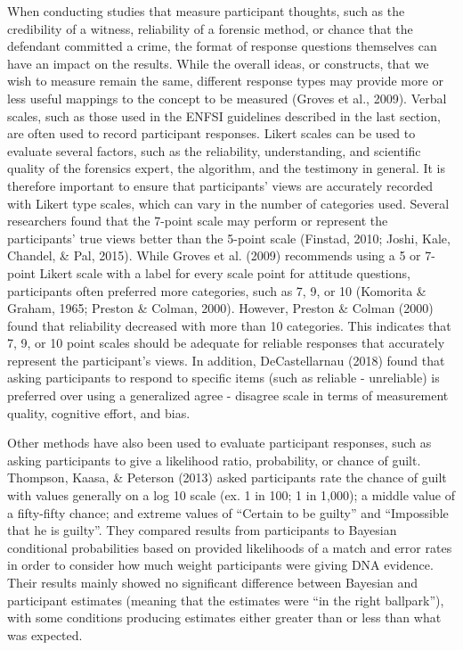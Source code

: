 \documentclass[print]{nuthesis}
\begin{document}
When conducting studies that measure participant thoughts, such as the credibility of a witness, reliability of a forensic method, or chance that the defendant committed a crime, the format of response questions themselves can have an impact on the results.
While the overall ideas, or constructs, that we wish to measure remain the same, different response types may provide more or less useful mappings to the concept to be measured (Groves et al., 2009).
Verbal scales, such as those used in the ENFSI guidelines described in the last section, are often used to record participant responses.
Likert scales can be used to evaluate several factors, such as the reliability, understanding, and scientific quality of the forensics expert, the algorithm, and the testimony in general.
It is therefore important to ensure that participants' views are accurately recorded with Likert type scales, which can vary in the number of categories used.
Several researchers found that the 7-point scale may perform or represent the participants' true views better than the 5-point scale (Finstad, 2010; Joshi, Kale, Chandel, \& Pal, 2015).
While Groves et al. (2009) recommends using a 5 or 7-point Likert scale with a label for every scale point for attitude questions, participants often preferred more categories, such as 7, 9, or 10 (Komorita \& Graham, 1965; Preston \& Colman, 2000).
However, Preston \& Colman (2000) found that reliability decreased with more than 10 categories.
This indicates that 7, 9, or 10 point scales should be adequate for reliable responses that accurately represent the participant's views.
In addition, DeCastellarnau (2018) found that asking participants to respond to specific items (such as reliable - unreliable) is preferred over using a generalized agree - disagree scale in terms of measurement quality, cognitive effort, and bias.

Other methods have also been used to evaluate participant responses, such as asking participants to give a likelihood ratio, probability, or chance of guilt.
Thompson, Kaasa, \& Peterson (2013) asked participants  rate the chance of guilt with values generally on a log 10 scale (ex. 1 in 100; 1 in 1,000); a middle value of a fifty-fifty chance; and extreme values of ``Certain to be guilty'' and ``Impossible that he is guilty''.
They compared results from participants to Bayesian conditional probabilities based on provided likelihoods of a match and error rates in order to consider how much weight participants were giving DNA evidence.
Their results mainly showed no significant difference between Bayesian and participant estimates (meaning that the estimates were ``in the right ballpark''), with some conditions producing estimates either greater than or less than what was expected.
\end{document}
